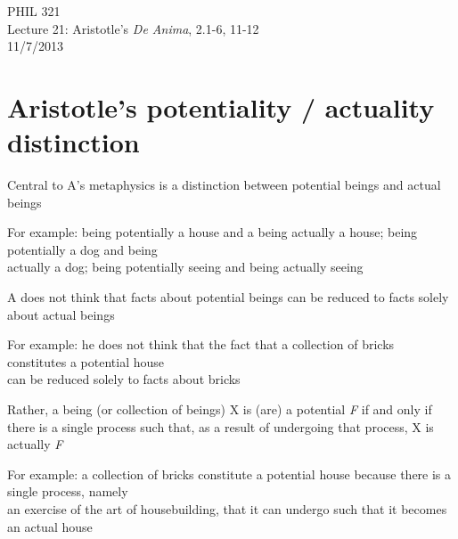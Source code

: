 \documentclass[11pt]{article}
\begin{document}
\thispagestyle{empty}
\begin{center} \LARGE{PHIL 321\\ Lecture 21: Aristotle's \emph{De Anima}, 2.1-6, 11-12}\\ \vspace*{2mm}
\large{11/7/2013}\end{center}
\thispagestyle{empty}\vspace*{3mm}
\vspace*{-8mm}

\section*{Aristotle's potentiality / actuality distinction}

\noindent Central to A's metaphysics is a distinction between potential beings and actual beings
\vspace*{2mm}

For example: being potentially a house and a being actually a house; being potentially a dog and being \\\hspace*{6mm}actually a dog; being potentially seeing and being actually seeing
\vspace*{2mm}

\noindent A does not think that facts about potential beings can be reduced to facts solely about actual beings
\vspace*{2mm}

For example: he does not think that the fact that a collection of bricks constitutes a potential house\\\hspace*{6mm}can be reduced solely to facts about bricks
\vspace*{2mm}

\noindent Rather, a being (or collection of beings) X is (are) a potential \emph{F} if and only if there is a single process such that, as a result of undergoing that process, X is actually \emph{F}
\vspace*{2mm}

For example: a collection of bricks constitute a potential house because there is a single process, namely\\\hspace*{6mm}an exercise of the art of housebuilding, that it can undergo such that it becomes an actual house
\vspace*{2mm}
\end{document}
